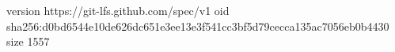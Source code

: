version https://git-lfs.github.com/spec/v1
oid sha256:d0bd6544e10de626dc651e3ee13e3f541cc3bf5d79cecca135ac7056eb0b4430
size 1557
